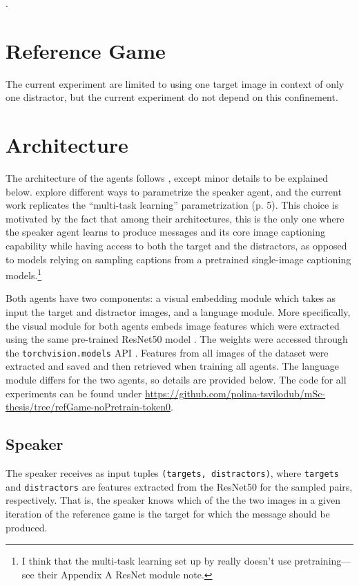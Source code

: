 .

\section{Reference Game}


The current experiment are limited to using one target image in context of only one distractor, but the current experiment do not depend on this confinement.



\section{Architecture}
The architecture of the agents follows \textcite{lazaridou2020multi}, except minor details to be explained below. \textcite{lazaridou2020multi} explore different ways to parametrize the speaker agent, and the current work replicates the ``multi-task learning'' parametrization (p. 5). This choice is motivated by the fact that among their architectures, this is the only one where the speaker agent learns to produce messages and its core image captioning capability while having access to both the target and the distractors, as opposed to models relying on sampling captions from a pretrained single-image captioning models.\footnote{I think that the multi-task learning set up by \textcite{lazaridou2020multi} really doesn't use pretraining---see their Appendix A ResNet module note.} 

Both agents have two components: a visual embedding module which takes as input the target and distractor images, and a language module. More specifically, the visual module for both agents embeds image features which were extracted using the same pre-trained ResNet50 model \parencite{he2016deep}. The weights were accessed through the \texttt{torchvision.models} API \parencite{marcel2010torchvision}. Features from all images of the dataset were extracted and saved and then retrieved when training all agents. 
The language module differs for the two agents, so details are provided below. 
The code for all experiments can be found under \url{https://github.com/polina-tsvilodub/mSc-thesis/tree/refGame-noPretrain-token0}. 

\subsection{Speaker}
The speaker receives as input tuples \texttt{(targets, distractors)}, where \texttt{targets} and \texttt{distractors} are features extracted from the ResNet50 for the sampled pairs, respectively. That is, the speaker knows which of the the two images in a given iteration of the reference game is the target for which the message should be produced. 

